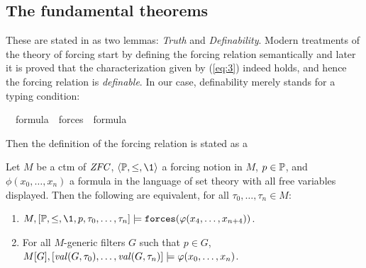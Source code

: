 \subsection{The fundamental theorems}
These are stated in \cite{kunen2011set} as two lemmas: \emph{Truth} and
\emph{Definability}.  Modern treatments of the theory of forcing start
by defining the 
forcing relation semantically and later it is proved  that the
characterization given by (\ref{eq:3}) indeed holds, and hence the
forcing relation is \emph{definable}. In our case, definability merely
stands for a typing condition:
\begin{isabelle}
{\isachardoublequoteopen}{\isasymphi}\ {\isasymin}\ formula\ {\isasymLongrightarrow}\ forces{\isacharparenleft}{\isasymphi}{\isacharparenright}\ {\isasymin}\ formula{\isachardoublequoteclose}
\end{isabelle}

Then the definition of the forcing relation is stated as a
\begin{lemma}\label{lem:definition-of-forcing}
  Let $M$ be a ctm of $\mathit{ZFC}$, $\lb\PP,\leq,\1\rb$ a forcing notion
  in $M$, $p\in\mathbb{P}$, and $\phi(x_0,\dots,x_n)$ a formula in the
  language of set 
  theory with all free variables displayed. Then the
  following are equivalent, for all $\tau_0,\dots,\tau_n\in M$:
  \begin{enumerate}
  \item $M,[\PP,\leq,\1,p,\tau_0,\dots,\tau_n] 
  \models\forceisa(\phi(x_4,\dots,x_{n+4}))$.
  \item For all $M$-generic filters $G$ such that $p\in G$,
    $M[G],[\operatorname{\mathit{val}}(G,\tau_0),\dots,\operatorname{\mathit{val}}(G,\tau_n)] \models\varphi(x_0,\dots,x_n)$.
  \end{enumerate}
\end{lemma}
  
